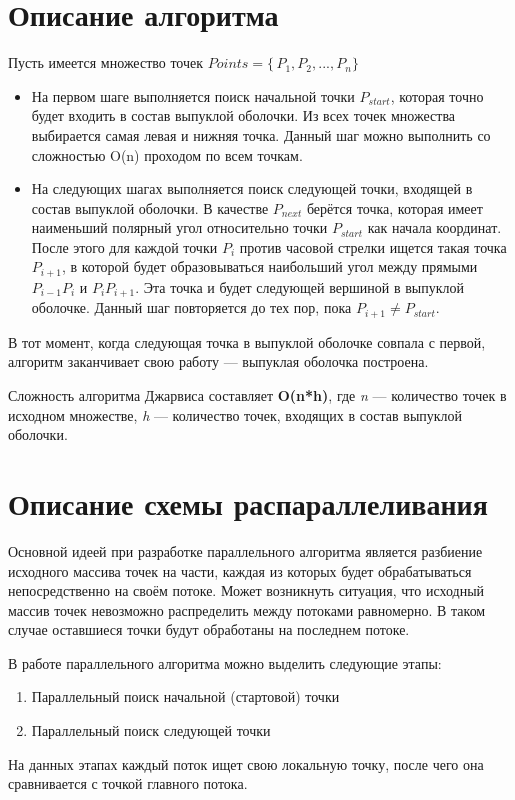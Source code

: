 \documentclass{report}
\begin{document}
\section*{Описание алгоритма}
\par Пусть имеется множество точек $Points =\{\,P_1, P_2, ..., P_n\}$
\begin{itemize}
\item На первом шаге выполняется поиск начальной точки $P_{start}$, которая точно будет входить в состав выпуклой оболочки. Из всех точек множества выбирается самая левая и нижняя точка. Данный шаг можно выполнить со сложностью O(n) проходом по всем точкам.
\item На следующих шагах выполняется поиск следующей точки, входящей в состав выпуклой оболочки. В качестве $P_{next}$ берётся точка, которая имеет наименьший полярный угол относительно точки $P_{start}$ как начала координат. После этого для каждой точки $P_i$ против часовой стрелки ищется такая точка $P_{i+1}$, в которой будет образовываться наибольший угол между прямыми $P_{i-1} P_i$ и $P_i P_{i+1}$. Эта точка и будет следующей вершиной в выпуклой оболочке. Данный шаг повторяется до тех пор, пока $P_{i+1} \neq P_{start}$.
\end{itemize}
\par В тот момент, когда следующая точка в выпуклой оболочке совпала с первой, алгоритм заканчивает свою работу — выпуклая оболочка построена.
\par Сложность алгоритма Джарвиса составляет \textbf{O(n*h)}, где \textit{n} — количество точек в исходном множестве, \textit{h} — количество точек, входящих в состав выпуклой оболочки.
\newpage

\section*{Описание схемы распараллеливания}
\par Основной идеей при разработке параллельного алгоритма является разбиение исходного массива точек на части, каждая из которых будет обрабатываться непосредственно на своём потоке. Может возникнуть ситуация, что исходный массив точек невозможно распределить между потоками равномерно. В таком случае оставшиеся точки будут обработаны на последнем потоке.
\par В работе параллельного алгоритма можно выделить следующие этапы:
\begin{enumerate}
    \item Параллельный поиск начальной (стартовой) точки
    \item Параллельный поиск следующей точки
\end{enumerate}
\par На данных этапах каждый поток ищет свою локальную точку, после чего она сравнивается с точкой главного потока.
\newpage
\end{document}
